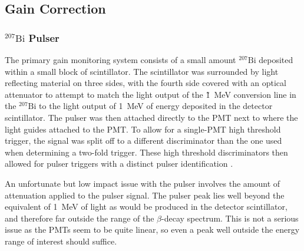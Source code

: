 \subsection{Gain Correction} \label{ssec:BiGain}

\subsubsection{$^{207}\mathrm{Bi}$ Pulser}
The primary gain monitoring system consists of a small amount $^{207}\mathrm{Bi}$
deposited within a small block of scintillator. The scintillator was surrounded by
light reflecting material on three sides, with the fourth side covered with an optical
attenuator to attempt to match the light output of the \~1~MeV conversion line in the $^{207}\mathrm{Bi}$
to the light output of 1~MeV of energy deposited in the detector scintillator. The pulser was then
attached directly to the PMT next to where the light guides attached to the PMT.
To allow for a single-PMT high threshold trigger, the signal was split off to a different
discriminator than the one used when determining a two-fold trigger. These high threshold
discriminators then allowed for pulser triggers with a distinct pulser identification \cite{mpmThesis}.

An unfortunate but low impact issue with the pulser involves the amount of attenuation applied to the
pulser signal. The pulser peak lies well beyond the equivalent of 1~MeV of light as would be produced
in the detector scintillator, and therefore far outside the range of the $\beta$-decay spectrum. This
is not a serious issue as the PMTs seem to be quite linear, so even a peak well outside the
energy range of interest should suffice.


